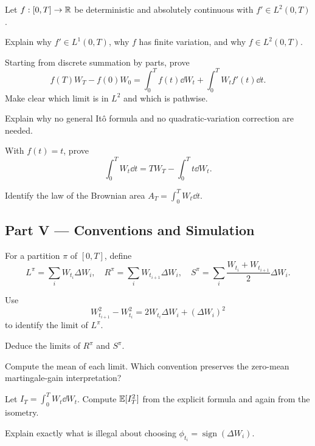 \begin{exercise}
Let \(f:[0,T]\to\mathbb{R}\) be deterministic and absolutely continuous with
\(f'\in L^2(0,T)\).
\begin{exparts}
  \item Explain why \(f'\in L^1(0,T)\), why \(f\) has finite variation, and
  why \(f\in L^2(0,T)\).
  \item Starting from discrete summation by parts, prove
  \[
  f(T)W_T-f(0)W_0
  =\int_0^Tf(t)\dd W_t+\int_0^TW_tf'(t)\dd t.
  \]
  Make clear which limit is in \(L^2\) and which is pathwise.
  \item Explain why no general It\^o formula and no quadratic-variation
  correction are needed.
  \item With \(f(t)=t\), prove
  \[
  \int_0^TW_t\dd t
  =TW_T-\int_0^Tt\dd W_t.
  \]
  \item Identify the law of the Brownian area
  \(A_T=\int_0^TW_t\dd t\).
\end{exparts}
\end{exercise}

\subsection*{Part V --- Conventions and Simulation}

\begin{exercise}
For a partition \(\pi\) of \([0,T]\), define
\[
L^\pi=\sum_iW_{t_i}\Delta W_i,
\quad
R^\pi=\sum_iW_{t_{i+1}}\Delta W_i,
\quad
S^\pi=\sum_i\frac{W_{t_i}+W_{t_{i+1}}}{2}\Delta W_i.
\]
\begin{exparts}
  \item Use
  \[
  W_{t_{i+1}}^2-W_{t_i}^2
  =2W_{t_i}\Delta W_i+(\Delta W_i)^2
  \]
  to identify the limit of \(L^\pi\).
  \item Deduce the limits of \(R^\pi\) and \(S^\pi\).
  \item Compute the mean of each limit. Which convention preserves the
  zero-mean martingale-gain interpretation?
  \item Let \(I_T=\int_0^TW_t\dd W_t\). Compute \(\mathbb{E}[I_T^2]\) from the
  explicit formula and again from the isometry.
  \item Explain exactly what is illegal about choosing
  \(\phi_{t_i}=\operatorname{sign}(\Delta W_i)\).
\end{exparts}
\end{exercise}


